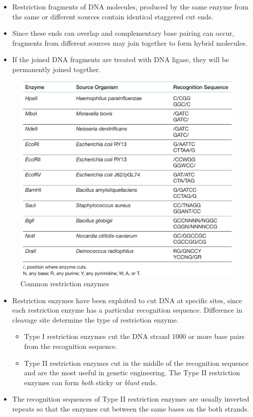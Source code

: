 \documentclass[11pt,dvipsnames,ignorenonframetext,aspectratio=169]{beamer}
\providecommand{\tightlist}{%
  \setlength{\itemsep}{0pt}\setlength{\parskip}{0pt}}
\begin{document}
\begin{frame}{}
\protect\hypertarget{section-11}{}
\begin{itemize}
\tightlist
\item
  Restriction fragments of DNA molecules, produced by the same enzyme
  from the same or different sources contain identical staggered cut
  ends.
\item
  Since these ends can overlap and complementary base pairing can occur,
  fragments from different sources may join together to form hybrid
  molecules.
\item
  If the joined DNA fragments are treated with DNA ligase, they will be
  permanently joined together.
\end{itemize}
\end{frame}

\begin{frame}{}
\protect\hypertarget{section-12}{}
\begin{figure}
\includegraphics[width=0.45\linewidth]{./../images/restriction_enzymes_ex} \caption{Common restriction enzymes}\label{fig:restriction-enzymes-ex}
\end{figure}
\end{frame}

\begin{frame}{}
\protect\hypertarget{section-13}{}
\begin{itemize}
\item
  Restriction enzymes have been exploited to cut DNA at specific sites,
  since each restriction enzyme has a particular recognition sequence.
  Difference in cleavage site determine the type of restriction enzyme.

  \begin{itemize}
  \tightlist
  \item
    Type I restriction enzymes cut the DNA strand 1000 or more base
    pairs from the recognition sequence.
  \item
    Type II restriction enzymes cut in the middle of the recognition
    sequence and are the most useful in genetic engineering. The Type II
    restriction enzymes can form \emph{both} sticky or \emph{blunt}
    ends.
  \end{itemize}
\item
  The recognition sequences of Type II restriction enzymes are usually
  inverted repeats so that the enzymes cut between the same bases on the
  both strands.
\end{itemize}
\end{frame}
\end{document}
